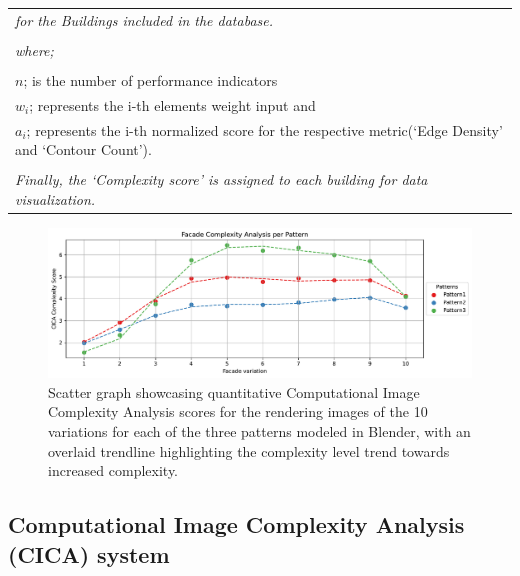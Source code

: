 \documentclass[final,5p,times]{elsarticle}%
\begin{document}
\begin{linenumbers}
\begin{table}[htb]
\begin{tabular}{|p{8cm}|}
                    \\
                    \textit{ for the Buildings included in the database.}\\
                    \\
                    \textit{where;} \\
                    \\
                    \(n \); is the number of performance indicators \\
                    \(w_i \); represents the i-th elements weight input and \\
                    \(a_i \); represents the i-th normalized score for the respective metric(`Edge Density' and `Contour Count').\\
                    \\

                    \textit{Finally, the `Complexity score' is assigned to each building for data visualization.}\\
                \hline
                \end{tabular}
            \end{table}

            \begin{figure}[!htb]
                  \centering
                  \includegraphics[width= \linewidth]{Graphs/complexitygraphrender}
                  \caption{Scatter graph showcasing quantitative Computational Image Complexity Analysis scores for the rendering images of the 10 variations for each of the three patterns modeled in Blender, with an overlaid trendline highlighting the complexity level trend towards increased complexity.}
                  \label{fig:complexitygraphRender}
            \end{figure}


    \subsection{Computational Image Complexity Analysis (CICA) system}
    \label{subsec:Image Complexity analysis}
    


\end{linenumbers}
\end{document}
